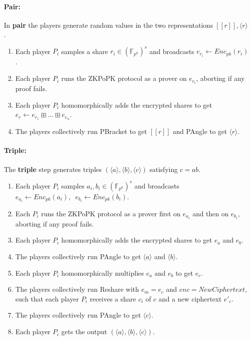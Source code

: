 \documentclass[../main.tex]{subfiles}
\begin{document}
\paragraph{Pair:}
In \textbf{pair} the players generate random values in the two representations $[\![ r ]\!], \langle r \rangle$.
\begin{enumerate}
    \item Each player $P_i$ samples a share $r_i \in (\mathbb{F}_{p^k})^s$ and broadcasts $e_{r_i} \leftarrow Enc_{pk}(r_i)$.
    \item Each player $P_i$ runs the ZKPoPK protocol as a prover on $e_{r_i}$, aborting if any proof fails.
    \item Each player $P_i$ homomorphically adds the encrypted shares to get $e_r \gets e_{r_1} \boxplus \dots \boxplus e_{e_n}$.
    \item The players collectively run PBracket to get $[\![ r ]\!]$ and PAngle to get $\langle r \rangle$.
\end{enumerate}

\paragraph{Triple:}
The \textbf{triple} step generates triples $(\langle a \rangle, \langle b \rangle, \langle c \rangle)$ satisfying $c = ab$. 
\begin{enumerate}
    \item Each player $P_i$ samples $a_i, b_i \in (\mathbb{F}_{p^k})^s$ and broadcasts $e_{a_i} \leftarrow Enc_{pk}(a_i), \;\; e_{b_i} \leftarrow Enc_{pk}(b_i)$.
    \item Each $P_i$ runs the ZKPoPK protocol as a prover first on $e_{a_i}$ and then on $e_{b_i}$, aborting if any proof fails.
    \item Each player $P_i$ homomorphically adds the encrypted shares to get $e_a$ and $e_b$.
    \item The players collectively run PAngle to get $\langle a \rangle$ and $\langle b \rangle$.
    \item Each player $P_i$ homomorphically multiplies $e_a$ and $e_b$ to get $e_c$.
    \item The players collectively run Reshare with $e_m = e_c$ and $enc = NewCiphertext$, such that each player $P_i$ receives a share $c_i$ of $c$ and a new ciphertext $e'_c$.
    \item The players collectively run PAngle to get $\langle c \rangle$.
    \item Each player $P_i$ gets the output $(\langle a \rangle, \langle b \rangle, \langle c \rangle)$.
\end{enumerate}
\end{document}
